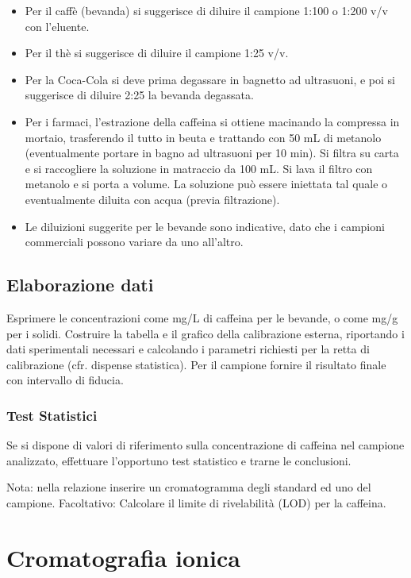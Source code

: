 \begin{itemize}
\item Per il caffè (bevanda) si suggerisce di diluire il campione 1:100 o 1:200 v/v con l'eluente.
\item Per il thè si suggerisce di diluire il campione 1:25 v/v.
\item Per la Coca-Cola si deve prima degassare in bagnetto ad ultrasuoni, e poi si suggerisce di diluire 2:25 la bevanda degassata.
\item Per i farmaci, l'estrazione della caffeina si ottiene macinando la compressa in mortaio, trasferendo il tutto in beuta e trattando con 50 mL di metanolo (eventualmente portare in bagno ad ultrasuoni per 10 min). Si filtra su carta e si raccogliere la soluzione in matraccio da 100 mL. Si lava il filtro con metanolo e si porta a volume. La soluzione può essere iniettata tal quale o eventualmente diluita con acqua (previa filtrazione).
\item Le diluizioni suggerite per le bevande sono indicative, dato che i campioni commerciali possono variare da uno all'altro.
\end{itemize}

\subsection{Elaborazione dati}
Esprimere le concentrazioni come mg/L di caffeina per le bevande, o come mg/g per i solidi. Costruire la tabella e il grafico della calibrazione esterna, riportando i dati sperimentali necessari e calcolando i parametri richiesti per la retta di calibrazione (cfr. dispense statistica). Per il campione fornire il risultato finale con intervallo di fiducia.

\subsubsection{Test Statistici}
Se si dispone di valori di riferimento sulla concentrazione di caffeina nel campione analizzato, effettuare l'opportuno test statistico e trarne le conclusioni.

Nota: nella relazione inserire un cromatogramma degli standard ed uno del campione.
Facoltativo: Calcolare il limite di rivelabilità (LOD) per la caffeina.

\section{Cromatografia ionica}

